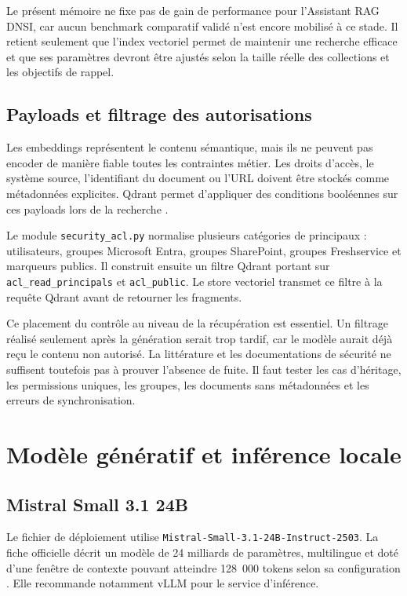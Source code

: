 Le présent mémoire ne fixe pas de gain de performance pour l'Assistant RAG DNSI, car aucun benchmark comparatif validé n'est encore mobilisé à ce stade. Il retient seulement que l'index vectoriel permet de maintenir une recherche efficace et que ses paramètres devront être ajustés selon la taille réelle des collections et les objectifs de rappel.

\subsection{Payloads et filtrage des autorisations}

Les embeddings représentent le contenu sémantique, mais ils ne peuvent pas encoder de manière fiable toutes les contraintes métier. Les droits d'accès, le système source, l'identifiant du document ou l'URL doivent être stockés comme métadonnées explicites. Qdrant permet d'appliquer des conditions booléennes sur ces payloads lors de la recherche \citep{QdrantFiltering2026}.

Le module \texttt{security\_acl.py} normalise plusieurs catégories de principaux : utilisateurs, groupes Microsoft Entra, groupes SharePoint, groupes Freshservice et marqueurs publics. Il construit ensuite un filtre Qdrant portant sur \texttt{acl\_read\_principals} et \texttt{acl\_public}. Le store vectoriel transmet ce filtre à la requête Qdrant avant de retourner les fragments.

Ce placement du contrôle au niveau de la récupération est essentiel. Un filtrage réalisé seulement après la génération serait trop tardif, car le modèle aurait déjà reçu le contenu non autorisé. La littérature et les documentations de sécurité ne suffisent toutefois pas à prouver l'absence de fuite. Il faut tester les cas d'héritage, les permissions uniques, les groupes, les documents sans métadonnées et les erreurs de synchronisation.

\section{Modèle génératif et inférence locale}

\subsection{Mistral Small 3.1 24B}

Le fichier de déploiement utilise \texttt{Mistral-Small-3.1-24B-Instruct-2503}. La fiche officielle décrit un modèle de 24 milliards de paramètres, multilingue et doté d'une fenêtre de contexte pouvant atteindre 128~000 tokens selon sa configuration \citep{MistralSmall31ModelCard}. Elle recommande notamment vLLM pour le service d'inférence.

